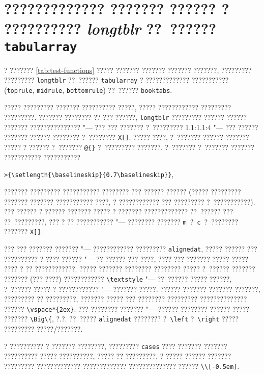 \section{????????????? ??????? ?????? ? ?????????? \textit{longtblr} ??~?????? \texttt{tabularray}}\label{app:B2a}

? ??????? \cref{tab:test-functions} ????? ??????? ??????? ??????? ???????,
????????? ????????? \verb!longtblr! ??~?????? \verb!tabularray! ? ?????????????
??????????? (\verb!toprule!, \verb!midrule!, \verb!bottomrule!) ??~??????
\verb!booktabs!.

????? ????????? ??????? ?????????? ?????, ????? ???????????? ?????????
?????????.
??????? ???????? ?? ??? ??????, \verb!longtblr! ????????? ?????? ?????? ???????
??????????????? "--- ??? ??? ??????? ?~????????? 1.1:1.1:4 "--- ??? ??????
??????? ?????? ???????? ?~???????? \verb!X[]!.
????? ????, ?~??????? ?????? ??????? ????? ? ?????? ?~??????? \verb!@{}!
?~????????? ???????.
?~??????? ?~??????? ??????? ??????????? ???????????

\verb!>{\setlength{\baselineskip}{0.7\baselineskip}}!,

\noindent ??????? ????????? ??????????? ???????? ??? ?????? ?????? (?????
????????? ??????? ??????? ??????????? ????, ? ???????????? ???
????????? ?~???????????). ??? ?????? ? ?????? ??????? ????? ? ???????
????????????? ??~?????? ??? ??~?????????, ??? ? ?? ??????????? "---
???????? ??????? \verb!m!~?~\verb!c!~?~???????? ??????? \verb!X[]!.

??? ??? ??????? ??????? "--- ???????????? ????????? \verb!alignedat!,
????? ?????? ??? ?????????? ? ???? ?????? "--- ?? ?????? ??? ????, ????
??? ??????? ????? ????? ???? ? ?? ????????????.  ????? ???????
???????? ???????? ????? ?~?????? ??????? ??????? (??? ????)
???????????? \verb!\textstyle! "--- ??~?????? ????? ??????, ?~??????
????? ? ???????????? "--- ??????? ?????. ?????? ??????? ??????? ???????,
????????? ?? ?????????, ??????? ????? ??? ???????? ?????????
?????????????? ?????? \verb!\vspace*{2ex}!. ??? ???????? ??????? "---
?????? ???????? ?????? ????? ??????? \verb!\Big\{!, ?.\:?. ??~?????
\verb!alignedat! ???????? ?~\verb!\left! ?~\verb!\right! ?????
????????? ?????/???????.

? ?????????? ? ??????? ????????, ????????? \verb!cases! ???? ???????
??????? ?????????? ????? ??????????, ????? ?? ?????????, ? ?????
?????? ??????? ????????? ????????????? ????????????? ??????????????
?????? \verb!\\[-0.5em]!.

